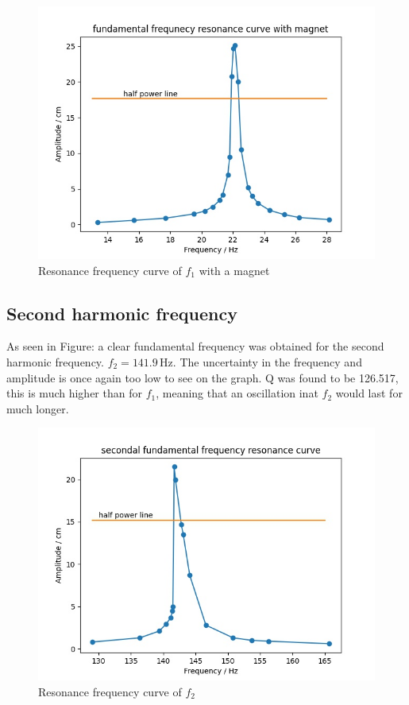 \documentclass{article}
\begin{document}
\begin{figure}[h]
    \centering
    \captionsetup{justification=centering}
    \includegraphics[width=12cm]{10_1.jpg}
    \caption{Resonance frequency curve of $f_1$ with a magnet\label{f2}}
\end{figure}

\newpage
\subsection*{Second harmonic frequency}
As seen in Figure: \label{f3} a clear fundamental frequency was obtained for the second harmonic frequency.
$f_2 =  141.9$\,Hz. The uncertainty in the frequency and amplitude is once again too low to see on the graph.
Q was found to be 126.517, this is much higher than for $f_1$, meaning that an oscillation inat $f_2$ would last 
for much longer. 
\begin{figure}[h]
    \centering
    \captionsetup{justification=centering}
    \includegraphics[width=12cm]{10_2.jpg}
    \caption{Resonance frequency curve of $f_2$\label{f3}}
\end{figure}
\end{document}
